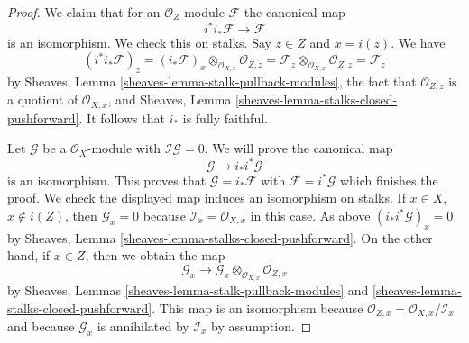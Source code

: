 \begin{proof}
We claim that for an $\mathcal{O}_Z$-module $\mathcal{F}$ the canonical map
$$
i^*i_*\mathcal{F} \longrightarrow \mathcal{F}
$$
is an isomorphism. We check this on stalks. Say $z \in Z$ and $x = i(z)$.
We have
$$
(i^*i_*\mathcal{F})_z =
(i_*\mathcal{F})_x \otimes_{\mathcal{O}_{X, x}} \mathcal{O}_{Z, z} =
\mathcal{F}_z \otimes_{\mathcal{O}_{X, x}} \mathcal{O}_{Z, z} =
\mathcal{F}_z
$$
by Sheaves, Lemma \ref{sheaves-lemma-stalk-pullback-modules},
the fact that $\mathcal{O}_{Z, z}$ is a quotient of $\mathcal{O}_{X, x}$, and
Sheaves, Lemma \ref{sheaves-lemma-stalks-closed-pushforward}.
It follows that $i_*$ is fully faithful.

\medskip\noindent
Let $\mathcal{G}$ be a $\mathcal{O}_X$-module with
$\mathcal{I}\mathcal{G} = 0$. We will prove the canonical map
$$
\mathcal{G} \longrightarrow i_*i^*\mathcal{G}
$$
is an isomorphism. This proves that $\mathcal{G} = i_*\mathcal{F}$
with $\mathcal{F} = i^*\mathcal{G}$ which finishes the proof.
We check the displayed map induces an isomorphism on stalks.
If $x \in X$, $x \not \in i(Z)$, then $\mathcal{G}_x = 0$
because $\mathcal{I}_x = \mathcal{O}_{X, x}$ in this
case. As above $(i_*i^*\mathcal{G})_x = 0$ by
Sheaves, Lemma \ref{sheaves-lemma-stalks-closed-pushforward}.
On the other hand, if $x \in Z$, then we obtain the map
$$
\mathcal{G}_x
\longrightarrow
\mathcal{G}_x \otimes_{\mathcal{O}_{X, x}} \mathcal{O}_{Z, x}
$$
by Sheaves, Lemmas \ref{sheaves-lemma-stalk-pullback-modules} and
\ref{sheaves-lemma-stalks-closed-pushforward}. This map is an isomorphism
because $\mathcal{O}_{Z, x} = \mathcal{O}_{X, x}/\mathcal{I}_x$
and because $\mathcal{G}_x$ is annihilated by $\mathcal{I}_x$ by assumption.
\end{proof}


